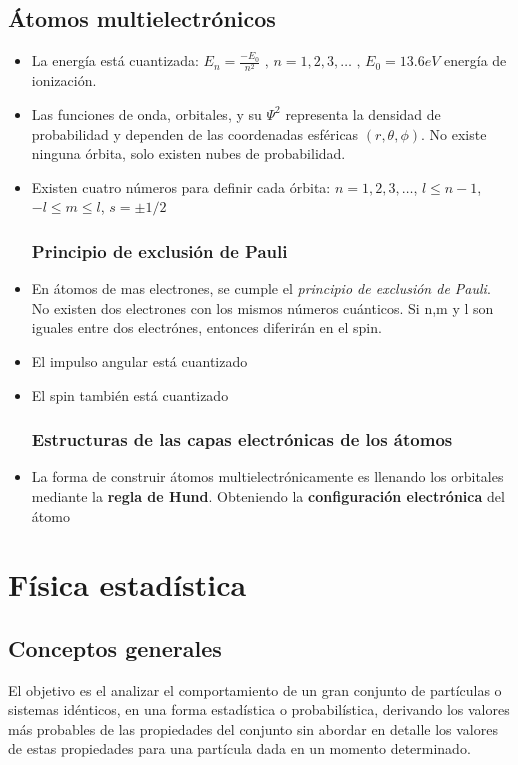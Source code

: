 \documentclass[oneside]{book}
\numberwithin{equation}{section}
\numberwithin{figure}{section}
\numberwithin{table}{section}
\begin{document}
		\section{Átomos multielectrónicos}
		
			\begin{itemize}
				\item La energía está cuantizada: $E_n=\frac{-E_0}{n^2} \text{ , } n=1,2,3,\ldots \text{ , } E_0=13.6 eV$ energía de ionización.
				\item Las funciones de onda, orbitales, y su $\Psi^2$ representa la densidad de probabilidad y dependen de las coordenadas esféricas $(r,\theta,\phi)$. No existe ninguna órbita, solo existen nubes de probabilidad.
				\item Existen cuatro números para definir cada órbita: $n=1,2,3,\ldots$, $l \leq n-1$, $-l \leq m \leq l$, $s=\pm 1/2$
			\subsection{Principio de exclusión de Pauli}	
				\item En átomos de mas electrones, se cumple el \emph{principio de exclusión de Pauli}. No existen dos electrones con los mismos números cuánticos. Si n,m y l son iguales entre dos electrónes, entonces diferirán en el spin.
				\item El impulso angular está cuantizado
				\item El spin también está cuantizado
			\subsection{Estructuras de las capas electrónicas de los átomos}
				\item La forma de construir átomos multielectrónicamente es llenando los orbitales mediante la \textbf{regla de Hund}. Obteniendo la \textbf{configuración electrónica} del átomo
			\end{itemize}					
								
	\chapter{Física estadística}
		\section{Conceptos generales}
		
			El objetivo es el analizar el comportamiento de un gran conjunto de partículas o sistemas idénticos, en una forma estadística o probabilística, derivando los valores más probables de las propiedades del conjunto sin abordar en detalle los valores de estas propiedades para una partícula dada en un momento determinado.\\
			
\end{document}
